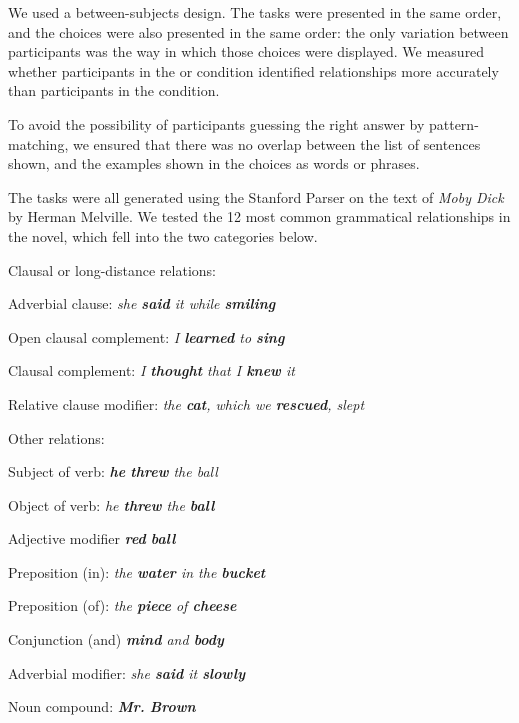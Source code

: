 We used a between-subjects design. The tasks were presented in the same order, and the choices were also presented in the same order: the only variation between participants was the way in which those choices were displayed. We measured whether participants in the  or  condition identified relationships more accurately than participants in the  condition.

To avoid the possibility of participants guessing the right answer by pattern-matching, we ensured that there was no overlap between the list of sentences shown, and the examples shown in the choices as words or phrases.

The tasks were all generated using the Stanford Parser on the text of \emph{Moby Dick} by Herman Melville.  We tested the 12 most common grammatical relationships in the novel, which fell into the two categories below.

\squishlist
\item Clausal or long-distance relations:
	\squishlist
		\item {} Adverbial clause: \emph{  she \textbf{said} it while \textbf{smiling}}
		\item  {} Open clausal complement:  \emph{I \textbf{learned} to \textbf{sing} }
		\item  {} Clausal complement:  \emph{ I \textbf{thought} that I \textbf{knew} it}
		\item  {} Relative clause modifier:  \emph{the \textbf{cat}, which we \textbf{rescued}, slept }
	\squishend
\item Other relations:
		\squishlist
			\item {} Subject of verb: \emph{\textbf{he} \textbf{threw} the ball}
			\item {} Object of verb:  \emph{ he \textbf{threw} the \textbf{ball}}
			\item {} Adjective modifier \emph{\textbf{red} \textbf{ball}}
			\item {}  Preposition (in): \emph{ the \textbf{water} in the \textbf{bucket}}
			\item {}	Preposition (of):  \emph{ the \textbf{piece} of \textbf{cheese}}
			\item {}  Conjunction (and)  \emph{ \textbf{mind} and \textbf{body}}
		\item{} Adverbial modifier: \emph{  she \textbf{said} it \textbf{slowly}}
		\item {} Noun compound:  \emph{ \textbf{Mr.}  \textbf{Brown}}
		\squishend
\squishend

